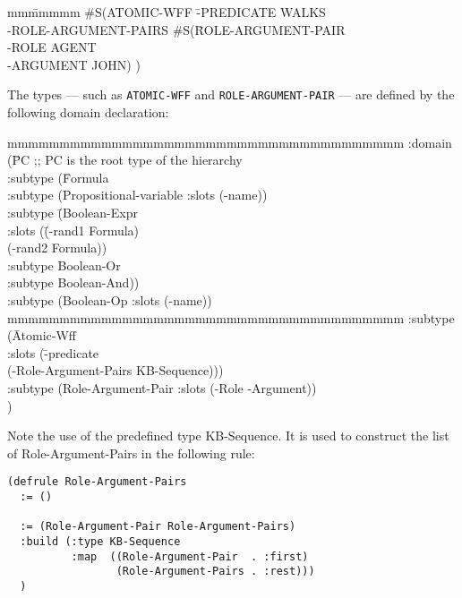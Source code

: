 {\samepage \tt \begin{tabbing}
mm\=mmmmm\kill
  \>\#S(ATOMIC-WFF \=-PREDICATE WALKS \\
  \>               \>-ROLE-ARGUMENT-PAIRS \#S(\=ROLE-ARGUMENT-PAIR\\
  \>               \>                         \>-ROLE AGENT\\
  \>               \>                         \>-ARGUMENT JOHN) )
     \end{tabbing}
}

The types --- such as {\tt ATOMIC-WFF} and {\tt ROLE-ARGUMENT-PAIR}
--- are defined by the following domain declaration:

{\tt \begin{tabbing}
mmmmmmmmmmmmmmmmmmmmmmmmmmmmmmmmmmmmmm\kill
 :domain (\=PC        ;; PC is the root type of the hierarchy\\
          \>:subtype (\=Formula \\
          \>          \>:subtype (Propositional-variable :slots (-name)) \\
          \>          \>:subtype \=(Boolean-Expr \\
          \>          \>         \> :slots (\=(-rand1    Formula) \\
          \>          \>         \>         \>(-rand2    Formula)) \\
          \>          \>         \>:subtype Boolean-Or \\
          \>          \>         \>:subtype Boolean-And)) \\
          \>:subtype (Boolean-Op :slots (-name)) \\
mmmmmmmmmmmmmmmmmmmmmmmmmmmmmmmmmmmmmm\kill
          \>:subtype (\=Atomic-Wff \\
          \>          \>:slots (\=-predicate\\
          \>          \>        \>(-Role-Argument-Pairs KB-Sequence))) \\
          \>:subtype (Role-Argument-Pair :slots (-Role -Argument)) \\
          \>)
\end{tabbing}}

Note the use of the predefined type KB-Sequence.  It is used to
construct the list of Role-Argument-Pairs in the following rule:

{\tt \begin{verbatim}
(defrule Role-Argument-Pairs
  := ()
    
  := (Role-Argument-Pair Role-Argument-Pairs)
  :build (:type KB-Sequence
          :map  ((Role-Argument-Pair  . :first)
                 (Role-Argument-Pairs . :rest)))
  )
     \end{verbatim}}

